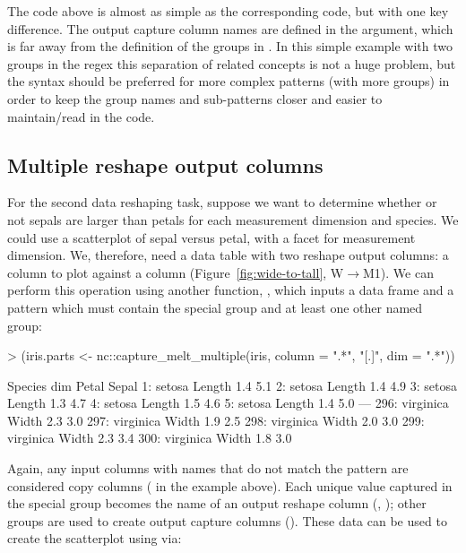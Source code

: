 The code above is almost as simple as the corresponding  code,
but with one key difference. The output capture column names are
defined in the  argument, which is far away from the
definition of the groups in . In this simple example
with two groups in the regex this separation of related concepts is
not a huge problem, but the  syntax should be preferred for
more complex patterns (with more groups) in order to keep the group
names and sub-patterns closer and easier to maintain/read in the code.

\subsection{Multiple reshape output columns}

For the second data reshaping task, suppose we want to determine
whether or not sepals are larger than petals for each measurement
dimension and species. We could use a scatterplot of sepal versus
petal, with a facet for measurement dimension. We, therefore, need a
data table with two reshape output columns: a  column to
plot against a  column (Figure~\ref{fig:wide-to-tall},
W$\rightarrow$M1). We can perform this operation using another
function, , which inputs a data
frame and a pattern which must contain the special  group
and at least one other named group:

\begin{Schunk}
\begin{Sinput}
> (iris.parts <- nc::capture_melt_multiple(iris, column = ".*", "[.]", dim = ".*"))
\end{Sinput}
\begin{Soutput}
       Species    dim Petal Sepal
  1:    setosa Length   1.4   5.1
  2:    setosa Length   1.4   4.9
  3:    setosa Length   1.3   4.7
  4:    setosa Length   1.5   4.6
  5:    setosa Length   1.4   5.0
 ---                             
296: virginica  Width   2.3   3.0
297: virginica  Width   1.9   2.5
298: virginica  Width   2.0   3.0
299: virginica  Width   2.3   3.4
300: virginica  Width   1.8   3.0
\end{Soutput}
\end{Schunk}

Again, any input columns with names that do not match the pattern are
considered copy columns ( in the example above). Each
unique value captured in the special  group becomes the
name of an output reshape column (, ); other
groups are used to create output capture columns (). These
data can be used to create the scatterplot using  via:

